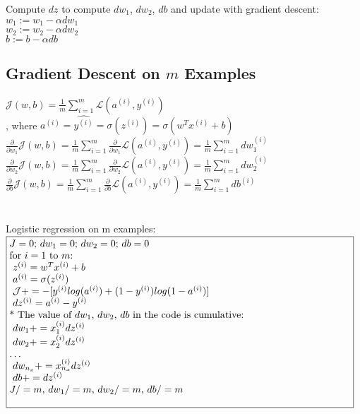 \documentclass{article}
\begin{document}
Compute $dz$ to compute $dw_1$, $dw_2$, $db$ and update with gradient descent:\\

$w_1 := w_1 - \alpha dw_1$\\

$w_2 := w_2 - \alpha dw_2$\\

$b := b - \alpha db $\\


\newpage
\subsection{Gradient Descent on $m$ Examples}

$\mathcal{J}(w,b) = \frac{1}{m}\sum_{i=1}^{m}\mathcal{L}(a^{(i)},y^{(i)})$\\

, where $a^{(i)} = \hat{y^{(i)}} = \sigma(z^{(i)}) = \sigma{(w^T x^{(i)} + b)}$\\

$\frac{\partial}{\partial w_1} \mathcal{J}(w,b) =\frac{1}{m}\sum_{i=1}^{m} \frac{\partial}{\partial w_1}\mathcal{L}(a^{(i)},y^{(i)})= \frac{1}{m}\sum_{i=1}^{m} dw_1^{(i)}$ \\

$\frac{\partial}{\partial w_2} \mathcal{J}(w,b) =\frac{1}{m}\sum_{i=1}^{m} \frac{\partial}{\partial w_2}\mathcal{L}(a^{(i)},y^{(i)})= \frac{1}{m}\sum_{i=1}^{m} dw_2^{(i)}$ \\

$\frac{\partial}{\partial b} \mathcal{J}(w,b) =\frac{1}{m}\sum_{i=1}^{m} \frac{\partial}{\partial b}\mathcal{L}(a^{(i)},y^{(i)})= \frac{1}{m}\sum_{i=1}^{m} db^{(i)}$ \\\\\\


Logistic regression on m examples:\\

$\noindent\fbox{%
\parbox{\textwidth}{%
$J=0$; $dw_1 = 0$; $dw_2 = 0$; $db=0$\\

for $i=1$ to $m$:\\
$\indent$ $z^{(i)} = w^T x^{(i)} + b$\\
$\indent$ $a^{(i)} = \sigma(z^{(i)})$\\
$\indent$ $\mathcal{J} += -[y^{(i)} log(a^{(i)}) + (1-y^{(i)})log(1-a^{(i)})]$\\
$\indent$ $dz^{(i)} = a^{(i)}- y^{(i)}$\\

* The value of $dw_1$, $dw_2$, $db$ in the code is cumulative:\\
$\indent$ $dw_1 += x_1^{(i)}dz^{(i)}$\\
$\indent$ $dw_2 += x_2^{(i)}dz^{(i)}$\\
$\dots$\\
$\indent$ $dw_{n_x} += x_{n_x}^{(i)}dz^{(i)}$\\

$\indent$ $db += dz^{(i)}$\\

$J/=m$,  $dw_1 /=m$,  $dw_2 /=m$,  $db /=m$\\
}%
}$\\
\end{document}

